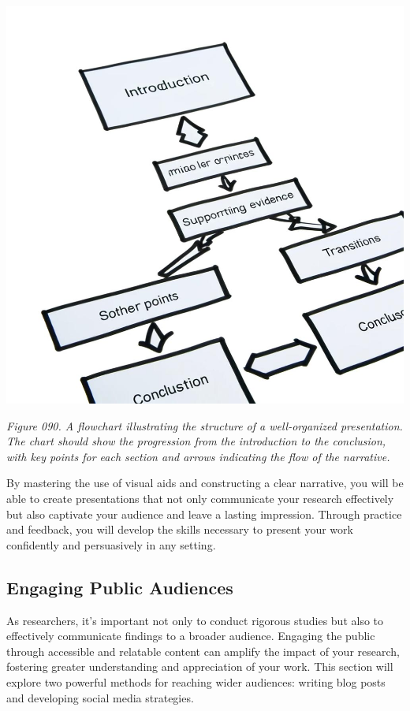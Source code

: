 \documentclass[
]{book}
\begin{document}
\includegraphics[width=1\textwidth,height=\textheight]{images/fig090.jpg}

\emph{Figure 090. A flowchart illustrating the structure of a well-organized presentation. The chart should show the progression from the introduction to the conclusion, with key points for each section and arrows indicating the flow of the narrative.}

By mastering the use of visual aids and constructing a clear narrative, you will be able to create presentations that not only communicate your research effectively but also captivate your audience and leave a lasting impression. Through practice and feedback, you will develop the skills necessary to present your work confidently and persuasively in any setting.

\subsection{Engaging Public Audiences}\label{engaging-public-audiences}

As researchers, it's important not only to conduct rigorous studies but also to effectively communicate findings to a broader audience. Engaging the public through accessible and relatable content can amplify the impact of your research, fostering greater understanding and appreciation of your work. This section will explore two powerful methods for reaching wider audiences: writing blog posts and developing social media strategies.
\end{document}
